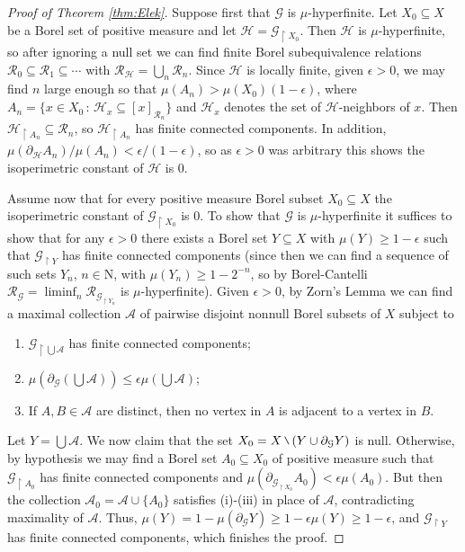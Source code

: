 \documentclass[11pt]{amsart}
\theoremstyle{definition}
\theoremstyle{plain}
\newcommand{\<}{\langle}
\renewcommand{\>}{\rangle}
\newcommand{\mc}[1]{\mathcal{#1}}
\newcommand{\subrel}{\subseteq}
\newcommand{\boundary}{\partial}
\newcommand{\N}{\bm{\mathrm{N}}}
\newcommand{\Ggraph}{\mathcal{G}}
\newcommand{\Hgraph}{\mathcal{H}}
\newcommand\RR{\mathscr{R}}
\newcommand{\mysetminusD}{\hbox{\tikz{\draw[line width=0.6pt,line cap=round] (3pt,0) -- (0,6pt);}}}
\newcommand{\mysetminusT}{\mysetminusD}
\newcommand{\mysetminusS}{\hbox{\tikz{\draw[line width=0.45pt,line cap=round] (2pt,0) -- (0,4pt);}}}
\newcommand{\mysetminusSS}{\hbox{\tikz{\draw[line width=0.4pt,line cap=round] (1.5pt,0) -- (0,3pt);}}}
\newcommand{\mysetminus}{\mathbin{\mathchoice{\mysetminusD}{\mysetminusT}{\mysetminusS}{\mysetminusSS}}}%
\begin{document}
\begin{proof}[Proof of Theorem \ref{thm:Elek}]
Suppose first that ${\Ggraph}$ is $\mu$-hyperfinite. Let $X_0\subseteq X$ be a Borel set of positive measure and let ${\Hgraph} = {\Ggraph}_{\restriction X_0}$. Then ${\Hgraph}$ is $\mu$-hyperfinite, so after ignoring a null set we can find finite Borel subequivalence relations $\RR_0\subrel  \RR_1\subrel  \cdots$ with $\RR_{{\Hgraph}} = \bigcup _n \RR_n$. Since ${\Hgraph}$ is locally finite,
given $\epsilon >0$, we may find $n$ large enough so that $\mu (A_n)>\mu (X_0)(1-\epsilon )$, where $A_n= \{ x\in X_0 \, : \, {\Hgraph}_x\subseteq [x]_{\RR_n} \}$ and ${\Hgraph}_x$ denotes the set of ${\Hgraph}$-neighbors of $x$. Then ${\Hgraph}_{\restriction A_n} \subseteq \RR_n$, so ${\Hgraph}_{\restriction A_n}$ has finite connected components. In addition, $\mu (\boundary _{\Hgraph} A_n)/\mu (A_n) < \epsilon /(1-\epsilon )$, so as $\epsilon >0$ was arbitrary this shows the isoperimetric constant of ${\Hgraph}$ is $0$.

Assume now that for every positive measure Borel subset $X_0\subseteq X$ the isoperimetric constant of ${\Ggraph}_{\restriction X_0}$ is $0$. To show that ${\Ggraph}$ is $\mu$-hyperfinite it suffices to show that for any $\epsilon >0$ there exists a Borel set $Y\subseteq X$ with $\mu (Y)\geq 1-\epsilon$ such that ${\Ggraph}_{\restriction Y}$ has finite connected components (since then we can find a sequence of such sets $Y_n$, $n\in \N$, with $\mu (Y_n)\geq 1-2^{-n}$, so by Borel-Cantelli $\RR_{\Ggraph}=\liminf _n \RR_{\Ggraph_{\restriction Y_n}}$ is $\mu$-hyperfinite). Given $\epsilon >0$, by Zorn's Lemma we can find a maximal collection $\mc{A}$ of pairwise disjoint nonnull Borel subsets of $X$ subject to
\begin{enumerate}
\item[(i)] ${\Ggraph}_{\restriction \bigcup \mc{A}}$ has finite connected components;
\item[(ii)] $\mu (\boundary _{\Ggraph} (\bigcup \mc{A})) \leq \epsilon \mu (\bigcup \mc{A} )$;
\item[(iii)] If $A,B\in \mc{A}$ are distinct, then no vertex in $A$ is adjacent to a vertex in $B$.
\end{enumerate}
Let $Y= \bigcup \mc{A}$. We now claim that the set $X_0 = X \mysetminus (Y \cup \boundary _{\Ggraph} Y)$ is null. Otherwise, by hypothesis we may find a Borel set $A_0\subseteq X_0$ of positive measure such that ${\Ggraph}_{\restriction A_0}$ has finite connected components and $\mu (\boundary _{{\Ggraph}_{\restriction X_0}} A_0 ) <\epsilon \mu (A_0)$. But then the collection $\mc{A}_0 = \mc{A}\cup \{ A_0 \}$ satisfies (i)-(iii) in place of $\mc{A}$, contradicting maximality of $\mc{A}$. Thus, $\mu (Y) = 1- \mu (\boundary _{\Ggraph} Y ) \geq 1- \epsilon \mu (Y) \geq 1-\epsilon$, and ${\Ggraph}_{\restriction Y}$ has finite connected components, which finishes the proof.
\end{proof}
\end{document}
